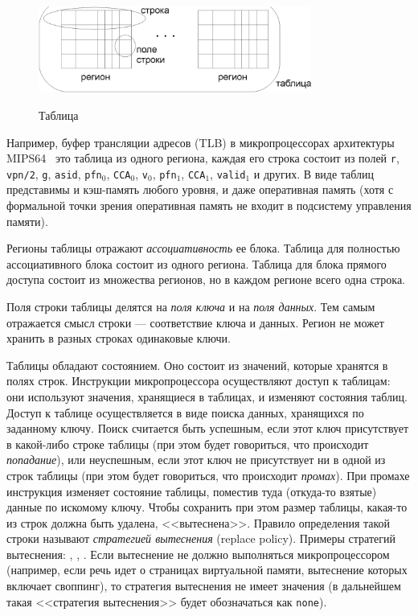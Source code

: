 \begin{figure}[h] \center
  \includegraphics[width=0.8\textwidth]{2.theor/table.eps}\\
  \caption{Таблица}\label{table_picture}
\end{figure}

Например, буфер трансляции адресов (TLB) в микропроцессорах архитектуры
MIPS64~\cite{mips64III} это таблица из одного региона, каждая его строка
состоит из полей \texttt{r}, \texttt{vpn/2}, \texttt{g}, \texttt{asid},
\texttt{pfn}$_0$, \texttt{CCA}$_0$, \texttt{v}$_0$, \texttt{pfn}$_1$,
\texttt{CCA}$_1$, \texttt{valid}$_1$ и других. В виде таблиц представимы и
кэш-память любого уровня, и даже оперативная память (хотя с формальной точки зрения оперативная
память не входит в подсистему управления памяти).

Регионы таблицы отражают \emph{ассоциативность} ее блока. Таблица для полностью
ассоциативного блока состоит из одного региона. Таблица для блока прямого
доступа состоит из множества регионов, но в каждом регионе всего одна строка.

Поля строки таблицы делятся на \emph{поля ключа} и на \emph{поля данных}. Тем
самым отражается смысл строки --- соответствие ключа и данных. Регион не может
хранить в разных строках одинаковые ключи.

Таблицы обладают состоянием. Оно состоит из значений, которые хранятся в полях
строк. Инструкции микропроцессора осуществляют доступ к таблицам: они используют
значения, хранящиеся в таблицах, и изменяют состояния таблиц. Доступ к таблице
осуществляется в виде поиска данных, хранящихся по заданному ключу. Поиск считается
быть успешным, если этот ключ присутствует в какой-либо строке таблицы (при этом
будет говориться, что происходит \emph{попадание}), или неуспешным, если этот
ключ не присутствует ни в одной из строк таблицы (при этом будет говориться, что
происходит \emph{промах}). При промахе инструкция изменяет состояние
таблицы, поместив туда (откуда-то взятые) данные по искомому ключу. Чтобы
сохранить при этом размер таблицы, какая-то из строк должна быть удалена,
<<вытеснена>>. Правило определения такой строки называют \emph{стратегией
вытеснения} (replace policy). Примеры стратегий вытеснения: \LRU, \FIFO,
\PseudoLRU. Если вытеснение не должно выполняться микропроцессором (например,
если речь идет о страницах виртуальной памяти, вытеснение которых включает своппинг), то стратегия вытеснения не имеет значения (в дальнейшем такая <<стратегия вытеснения>> будет обозначаться как \texttt{none}).

